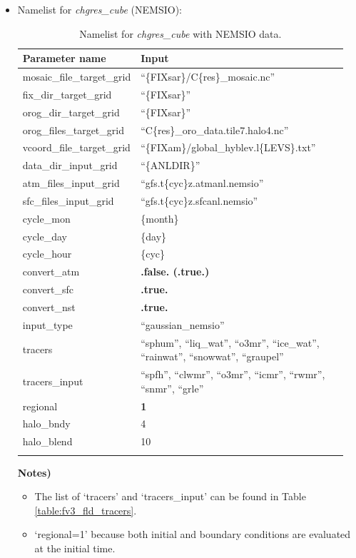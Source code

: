\documentclass[11pt,fleqn]{report}              %
\begin{document}
\begin{itemize}
\item Namelist for {\it chgres\_cube} (NEMSIO):
{
\fontsize{9}{11}\selectfont
\begin{longtable}{p{0.23\linewidth} | p{0.72\linewidth} }
\hline
\hline
Parameter name & Input \\
\hline
 mosaic\_file\_target\_grid  & ``\{FIXsar\}/C\{res\}\_mosaic.nc''  \\
 fix\_dir\_target\_grid & ``\{FIXsar\}'' \\
 orog\_dir\_target\_grid & ``\{FIXsar\}'' \\
 orog\_files\_target\_grid & ``C\{res\}\_oro\_data.tile7.halo4.nc'' \\
 vcoord\_file\_target\_grid & ``\{FIXam\}/global\_hyblev.l\{LEVS\}.txt'' \\
 data\_dir\_input\_grid & ``\{ANLDIR\}''\\
 atm\_files\_input\_grid & ``gfs.t\{cyc\}z.atmanl.nemsio'' \\
 sfc\_files\_input\_grid & ``gfs.t\{cyc\}z.sfcanl.nemsio'' \\
 cycle\_mon & \{month\} \\
 cycle\_day &\{day\}  \\
 cycle\_hour & \{cyc\} \\
 convert\_atm & {\bf .false. (.true.) } \\
 convert\_sfc & {\bf .true. } \\
 convert\_nst & {\bf .true. } \\
 input\_type & ``gaussian\_nemsio'' \\
 tracers &``sphum'', ``liq\_wat'', ``o3mr'', ``ice\_wat'', ``rainwat'', ``snowwat'', ``graupel'' \\
 tracers\_input & ``spfh'', ``clwmr'', ``o3mr'', ``icmr'', ``rwmr'', ``snmr'', ``grle'' \\
 regional & {\bf 1} \\
 halo\_bndy & 4 \\
 halo\_blend & 10 \\
\hline
\caption{Namelist for {\it chgres\_cube} with NEMSIO data.}
\label{table:namelist_ic_chgres}
\end{longtable}
}

{\bf Notes)} 
\begin{itemize}
\item The list of `tracers' and `tracers\_input' can be found in Table \ref{table:fv3_fld_tracers}.
\item `regional=1' because both initial and boundary conditions are evaluated at the initial time.
\end{itemize}

\end{itemize}
\end{document}
